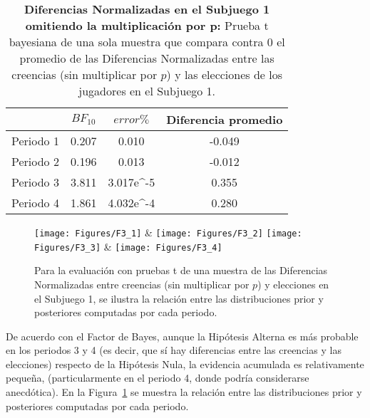 \begin{table}[h]
\caption[Diferencias Normalizadas en el Subjuego 1, omitiendo la multiplicación por $p$ (prueba t de una muestra)]{\textbf{Diferencias Normalizadas en el Subjuego 1 omitiendo la multiplicación por p:} Prueba t bayesiana de una sola muestra que compara contra 0 el promedio de las Diferencias Normalizadas entre las creencias (sin multiplicar por $p$) y las elecciones de los jugadores en el Subjuego 1.}
\label{DNnop-S1-B}
\centering
\begin{tabular}{l | c c | c}
\toprule
\textbf{} & \textbf{$BF_{10}$} & \textbf{$error\%$} & \textbf{Diferencia promedio}\\
\midrule
Periodo 1 & 0.207 & 0.010 & -0.049\\
Periodo 2 & 0.196 & 0.013 & -0.012\\
Periodo 3 & 3.811 & 3.017e^-5 & 0.355\\
Periodo 4 & 1.861 & 4.032e^-4 & 0.280\\
\bottomrule
\end{tabular}
\end{table}

\begin{figure}[h]
\centering
\texttt{[image: Figures/F3\_1]} & \texttt{[image: Figures/F3\_2]} 
\texttt{[image: Figures/F3\_3]} & \texttt{[image: Figures/F3\_4]} 
\decoRule
\caption[Diferencias Normalizadas entre creencias y elecciones en el Subjuegoo 1, omitiendo la multiplicación por $p$ (Factor de Bayes)]{Para la evaluación con pruebas t de una muestra de las Diferencias Normalizadas entre creencias (sin multiplicar por $p$) y elecciones en el Subjuego 1, se ilustra la relación entre las distribuciones prior y posteriores computadas por cada periodo.}
\label{fig:DNnop_S1}
\end{figure}

De acuerdo con el Factor de Bayes, aunque la Hipótesis Alterna es más probable en los periodos 3 y 4 (es decir, que sí hay diferencias entre las creencias y las elecciones) respecto de la Hipótesis Nula, la evidencia acumulada es relativamente pequeña, (particularmente en el periodo 4, donde podría considerarse anecdótica). En la Figura~\ref{fig:DNnop_S1} se muestra la relación entre las distribuciones prior y posteriores computadas por cada periodo.\\

